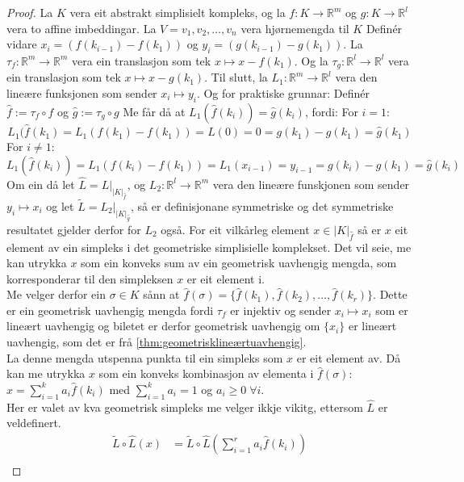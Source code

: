\documentclass[a4paper, titlepage, 12pt, norsk]{article}
\theoremstyle{plain}
\theoremstyle{definition}
\newcommand{\R}{\mathbb{R}}
\begin{document}
\begin{proof}%
	La $K$ vera eit abstrakt simplisielt kompleks, og la $f:K\to\R^m$ og $g:K\to\R^l$ vera to affine imbeddingar. La $V={v_1, v_2, \dots, v_n}$ vera hjørnemengda til $K$ Definér vidare $x_i=(f(k_{i-1})-f(k_1))$ og $y_i=(g(k_{i-1})-g(k_1))$. La $\tau_f:\R^m\to\R^m$ vera ein translasjon som tek $x\mapsto x-f(k_1)$. Og la $\tau_g:\R^l\to\R^l$ vera ein translasjon som tek $x\mapsto x-g(k_1)$. Til slutt, la $L_1:\R^m\to\R^l$ vera den lineære funksjonen som sender $x_i\mapsto y_i$.
Og for praktiske grunnar: Definér $\hat{f}:=\tau_f\circ f$ og $\hat{g}:=\tau_g \circ g$
Me får då at $L_1(\hat{f}(k_i))=\hat{g}(k_i)$, fordi:
For $i=1$:
\begin{equation*}
	L_1(\hat{f}(k_1)=L_1(f(k_1)-f(k_1))=L(0)=0=g(k_1)-g(k_1)=\hat{g}(k_1)
\end{equation*}
For $i\neq 1$:
\begin{equation*}
	L_1(\hat{f}(k_i))=L_1(f(k_i)-f(k_1))=L_1(x_{i-1})=y_{i-1}=g(k_i)-g(k_1)=\hat{g}(k_i)
\end{equation*}
Om ein då let $\hat{L}=L|_{|K|_{\hat{f}}}$, og $L_2:\R^l\to\R^m$ vera den lineære funskjonen som sender $y_i\mapsto x_i$ og let $\tilde{L}=L_2|_{|K|_{\hat{g}}}$, så er definisjonane symmetriske og det symmetriske resultatet gjelder derfor for $L_2$ også. 
For eit vilkårleg element $x\in|K|_{\hat{f}}$ så er $x$ eit element av ein simpleks i det geometriske simplisielle komplekset. Det vil seie, me kan utrykka $x$ som ein konveks sum av ein geometrisk uavhengig mengda, som korresponderar til den simpleksen $x$ er eit element i.
\\Me velger derfor ein $\sigma\in K$ sånn at $\hat{f}(\sigma)=\{\hat{f}(k_1), \hat{f}(k_2), \dots, \hat{f}(k_r)\}$. Dette er ein geometrisk uavhengig mengda fordi $\tau_f$ er injektiv og sender $x_i\mapsto x_i$ som er lineært uavhengig og biletet er derfor geometrisk uavhengig om $\{x_i\}$ er lineært uavhengig, som det er frå \autoref{thm:geometrisklineærtuavhengig}.
\\La denne mengda utspenna punkta til ein simpleks som $x$ er eit element av. Då kan me utrykka $x$ som ein konveks kombinasjon av elementa i $\hat{f}(\sigma)$: $x=\sum_{i=1}^ka_i\hat{f}(k_i)$ med $\sum_{i=1}^ka_i=1$ og $a_i\geq0\; \forall i$. 
\\Her er valet av kva geometrisk simpleks me velger ikkje vikitg, ettersom $\hat{L}$ er veldefinert.
\begin{align*}
	\tilde{L}\circ \hat{L}(x) &= \tilde{L}\circ \hat{L}\left(\sum_{i=1}^ra_i\hat{f}(k_i)\right) \\

\end{align*}
\end{proof}
\end{document}
